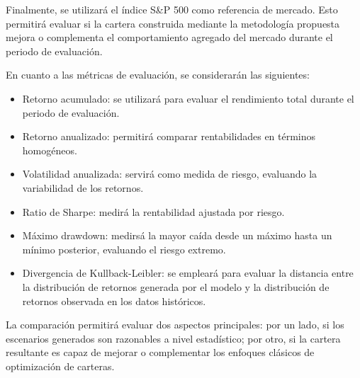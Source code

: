 Finalmente, se utilizará el índice S\&P 500 como referencia de mercado. Esto permitirá evaluar si la cartera construida mediante la metodología propuesta mejora o complementa el comportamiento agregado del mercado durante el periodo de evaluación.

En cuanto a las métricas de evaluación, se considerarán las siguientes:

\begin{itemize}
\item Retorno acumulado: se utilizará para evaluar el rendimiento total durante el periodo de evaluación.
\item Retorno anualizado: permitirá comparar rentabilidades en términos homogéneos.
\item Volatilidad anualizada: servirá como medida de riesgo, evaluando la variabilidad de los retornos.
\item Ratio de Sharpe: medirá la rentabilidad ajustada por riesgo.
\item Máximo drawdown: medirsá la mayor caída desde un máximo hasta un mínimo posterior, evaluando el riesgo extremo.
\item Divergencia de Kullback-Leibler: se empleará para evaluar la distancia entre la distribución de retornos generada por el modelo y la distribución de retornos observada en los datos históricos.
\end{itemize}

La comparación permitirá evaluar dos aspectos principales: por un lado, si los escenarios generados son razonables a nivel estadístico; por otro, si la cartera resultante es capaz de mejorar o complementar los enfoques clásicos de optimización de carteras.
